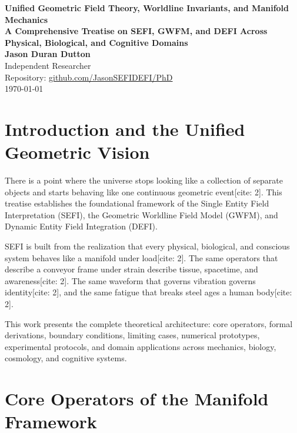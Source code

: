 \documentclass[11pt,book]{report}
\begin{document}
\begin{titlepage}
    \centering
    \vspace*{2cm}
    {\Huge \bfseries Unified Geometric Field Theory, Worldline Invariants, and Manifold Mechanics} \\
    \vspace{1cm}
    {\Large \textbf{A Comprehensive Treatise on SEFI, GWFM, and DEFI Across Physical, Biological, and Cognitive Domains}} \\
    \vspace{1.5cm}
    {\large \textbf{Jason Duran Dutton}} \\
    \vspace{0.5cm}
    Independent Researcher \\
    Repository: \url{github.com/JasonSEFIDEFI/PhD} \\
    \vspace{2cm}
    \today
    \vfill
\end{titlepage}

\newpage
\tableofcontents
\newpage

\chapter{Introduction and the Unified Geometric Vision}

There is a point where the universe stops looking like a collection of separate objects and starts behaving like one continuous geometric event[cite: 2]. This treatise establishes the foundational framework of the Single Entity Field Interpretation (SEFI), the Geometric Worldline Field Model (GWFM), and Dynamic Entity Field Integration (DEFI). 

SEFI is built from the realization that every physical, biological, and conscious system behaves like a manifold under load[cite: 2]. The same operators that describe a conveyor frame under strain describe tissue, spacetime, and awareness[cite: 2]. The same waveform that governs vibration governs identity[cite: 2], and the same fatigue that breaks steel ages a human body[cite: 2]. 

This work presents the complete theoretical architecture: core operators, formal derivations, boundary conditions, limiting cases, numerical prototypes, experimental protocols, and domain applications across mechanics, biology, cosmology, and cognitive systems.

\chapter{Core Operators of the Manifold Framework}
\end{document}
